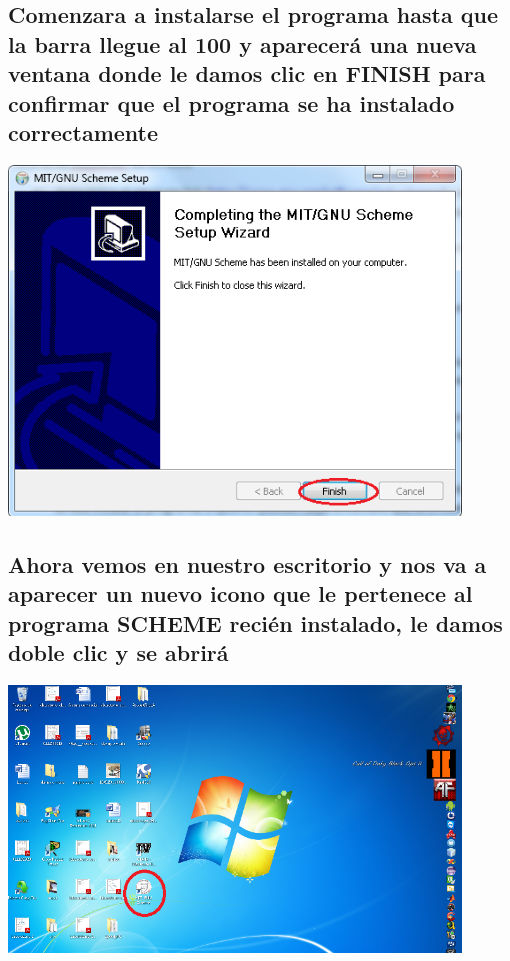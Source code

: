 \documentclass[11pt]{article} %
\begin{document}
\subsection{Comenzara a instalarse el programa hasta que la barra llegue al 100 y aparecerá una nueva ventana donde le damos clic en FINISH para confirmar que el programa se ha instalado correctamente}
\begin{center}
\includegraphics[width=12cm]{imagenes/6.png}
\end{center}

\subsection{Ahora vemos en nuestro escritorio y nos va a aparecer un nuevo icono que le pertenece al programa SCHEME recién instalado, le damos doble clic y se abrirá}
\begin{center}
\includegraphics[width=12cm]{imagenes/7.png}
\end{center}
\end{document}
